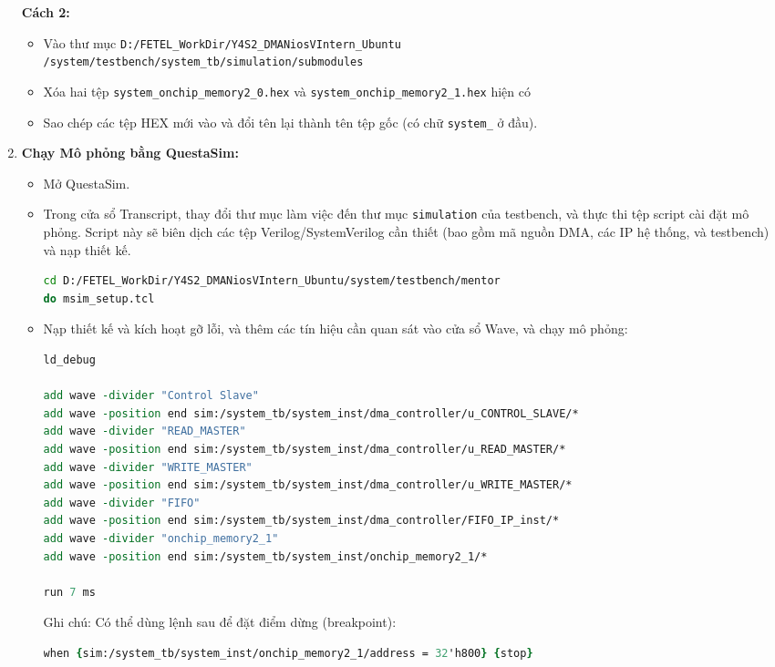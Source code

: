 \begin{enumerate}
    \textbf{Cách 2:}
    \begin{itemize}
        \item Vào thư mục \texttt{D:/FETEL\_WorkDir/Y4S2\_DMANiosVIntern\_Ubuntu\\/system/testbench/system\_tb/simulation/submodules}
        \item Xóa hai tệp \texttt{system\_onchip\_memory2\_0.hex} và \texttt{system\_onchip\_memory2\_1.hex} hiện có
        \item Sao chép các tệp HEX mới vào và đổi tên lại thành tên tệp gốc (có chữ \texttt{system\_} ở đầu).
    \end{itemize}

    \item \textbf{Chạy Mô phỏng bằng QuestaSim:}
        \begin{itemize}
            \item Mở QuestaSim.
            \item Trong cửa sổ Transcript, thay đổi thư mục làm việc đến thư mục \texttt{simulation} của testbench, và thực thi tệp script cài đặt mô phỏng. Script này sẽ biên dịch các tệp Verilog/SystemVerilog cần thiết (bao gồm mã nguồn DMA, các IP hệ thống, và testbench) và nạp thiết kế.
            \begin{lstlisting}[language=bash, caption={Thiết lập môi trường mô phỏng bằng QuestaSim}, label={lst:msim_setup_tcl_changepath}]
cd D:/FETEL_WorkDir/Y4S2_DMANiosVIntern_Ubuntu/system/testbench/mentor
do msim_setup.tcl \end{lstlisting}
            
            \item Nạp thiết kế và kích hoạt gỡ lỗi, và thêm các tín hiệu cần quan sát vào cửa sổ Wave, và chạy mô phỏng:
            \begin{lstlisting}[language=tcl, caption={Biên dịch và nạp các thiết kế, thêm hiển thị dạng sóng các tín hiệu, và chạy mô phỏng}, label={lst:msim_simulation}]
ld_debug

add wave -divider "Control Slave"
add wave -position end sim:/system_tb/system_inst/dma_controller/u_CONTROL_SLAVE/*
add wave -divider "READ_MASTER"
add wave -position end sim:/system_tb/system_inst/dma_controller/u_READ_MASTER/*
add wave -divider "WRITE_MASTER"
add wave -position end sim:/system_tb/system_inst/dma_controller/u_WRITE_MASTER/*
add wave -divider "FIFO"
add wave -position end sim:/system_tb/system_inst/dma_controller/FIFO_IP_inst/*
add wave -divider "onchip_memory2_1"
add wave -position end sim:/system_tb/system_inst/onchip_memory2_1/*

run 7 ms \end{lstlisting}
            Ghi chú: Có thể dùng lệnh sau để đặt điểm dừng (breakpoint):
            \begin{lstlisting}[language=tcl]
when {sim:/system_tb/system_inst/onchip_memory2_1/address = 32'h800} {stop}
            \end{lstlisting}
        \end{itemize}
\end{enumerate}


